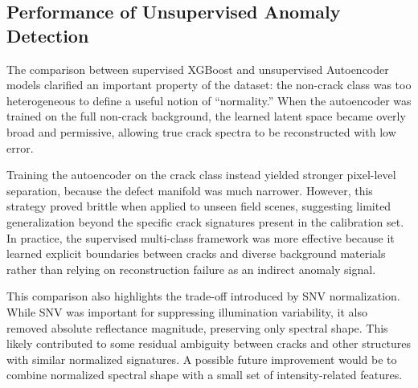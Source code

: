 
\subsection{Performance of Unsupervised Anomaly Detection}
\noindent
The comparison between supervised XGBoost and unsupervised Autoencoder models clarified an important property of the dataset: the non-crack class was too heterogeneous to define a useful notion of ``normality.'' When the autoencoder was trained on the full non-crack background, the learned latent space became overly broad and permissive, allowing true crack spectra to be reconstructed with low error.

\medskip\noindent
Training the autoencoder on the crack class instead yielded stronger pixel-level separation, because the defect manifold was much narrower. However, this strategy proved brittle when applied to unseen field scenes, suggesting limited generalization beyond the specific crack signatures present in the calibration set. In practice, the supervised multi-class framework was more effective because it learned explicit boundaries between cracks and diverse background materials rather than relying on reconstruction failure as an indirect anomaly signal.

\medskip\noindent
This comparison also highlights the trade-off introduced by SNV normalization. While SNV was important for suppressing illumination variability, it also removed absolute reflectance magnitude, preserving only spectral shape. This likely contributed to some residual ambiguity between cracks and other structures with similar normalized signatures. A possible future improvement would be to combine normalized spectral shape with a small set of intensity-related features.

